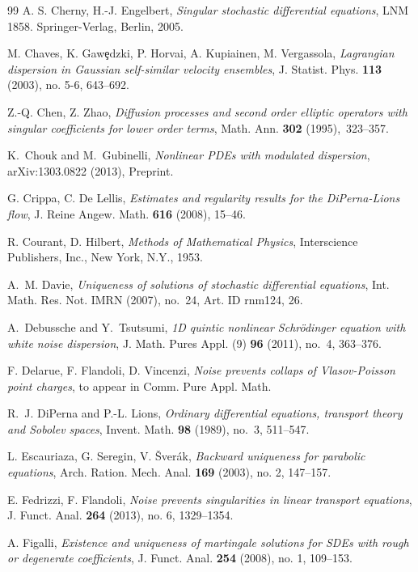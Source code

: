 \documentclass[a4paper,10pt]{article}
\begin{document}
\begin{thebibliography}{99}
A. S. Cherny, H.-J. Engelbert, \textit{Singular
stochastic differential equations}, LNM 1858. Springer-Verlag, Berlin, 2005.

M. Chaves, K. Gaw{\c{e}}dzki, P. Horvai, A. Kupiainen, M. Vergassola,
\textit{Lagrangian dispersion in Gaussian self-similar velocity ensembles}, J.
Statist. Phys. \textbf{113} (2003), no. 5-6, 643--692.

Z.-Q. Chen, Z. Zhao, \textit{Diffusion processes and second order
elliptic operators with singular coefficients for lower order terms},
Math. Ann. \textbf{302} (1995),\ 323--357.

K.~Chouk and M.~Gubinelli, \textit{Nonlinear {PDE}s with modulated dispersion},
  arXiv:1303.0822 (2013), Preprint.

G. Crippa, C. De Lellis, \textit{Estimates and regularity results for the
DiPerna-Lions flow}, J. Reine Angew. Math. \textbf{616} (2008), 15--46.

R. Courant, D. Hilbert, \textit{Methods of Mathematical Physics}, Interscience
Publishers, Inc., New York, N.Y., 1953.

A.~M. Davie, \textit{Uniqueness of solutions of stochastic differential
  equations}, Int. Math. Res. Not. IMRN (2007), no.~24, Art. ID rnm124, 26.

A.~Debussche and Y.~Tsutsumi, \textit{1{D} quintic nonlinear {S}chr\"odinger
  equation with white noise dispersion}, J. Math. Pures Appl. (9) \textbf{{\bf
  96}} (2011), no.~4, 363--376.

F. Delarue, F. Flandoli, D. Vincenzi, \textit{Noise prevents collaps of Vlasov-Poisson point charges}, to appear in Comm. Pure Appl. Math.

R.~J. DiPerna and P.-L. Lions, \textit{Ordinary differential equations, transport
  theory and {S}obolev spaces}, Invent. Math. \textbf{{\bf 98}} (1989), no.~3,
  511--547.

L. Escauriaza, G. Seregin, V. \v{S}ver\'{a}k, \textit{Backward uniqueness for
parabolic equations}, Arch. Ration. Mech. Anal. \textbf{169} (2003),
no. 2, 147--157.

 E. Fedrizzi, F. Flandoli, \textit{Noise prevents singularities in linear transport equations}, J. Funct. Anal. \textbf{264} (2013), no. 6, 1329--1354.

 A. Figalli, \textit{Existence and uniqueness of martingale solutions for SDEs with rough or degenerate coefficients}, J. Funct. Anal. \textbf{254}
(2008), no. 1, 109--153.


\end{thebibliography}
\end{document}
